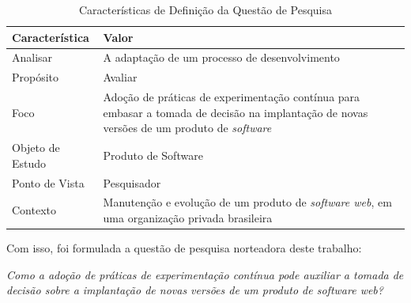\begin{table}[!h]
\centering
    \caption{Características de Definição da Questão de Pesquisa}
        \begin{tabular}{|p{4cm}|p{10cm}|}
            \hline
            \textbf{Característica} & \textbf{Valor} \\
            \hline
            Analisar & A adaptação de um processo de desenvolvimento \\
            Propósito & Avaliar \\
            Foco & Adoção de práticas de experimentação contínua para embasar a tomada de decisão na implantação de novas versões de um produto de \textit{software} \\
            Objeto de Estudo & Produto de Software \\
            Ponto de Vista & Pesquisador \\
            Contexto & Manutenção e evolução de um produto de \textit{software web}, em uma organização privada brasileira \\
            \hline
        \end{tabular}
    

    \begin{center}
    \end{center}

    \label{tab:gqm}
\end{table}

Com isso, foi formulada a questão de pesquisa norteadora deste trabalho:

\begin{center}
    \textit{Como a adoção de práticas de experimentação contínua pode auxiliar a tomada de decisão sobre a implantação de novas versões de um produto de software web?}   
\end{center}
